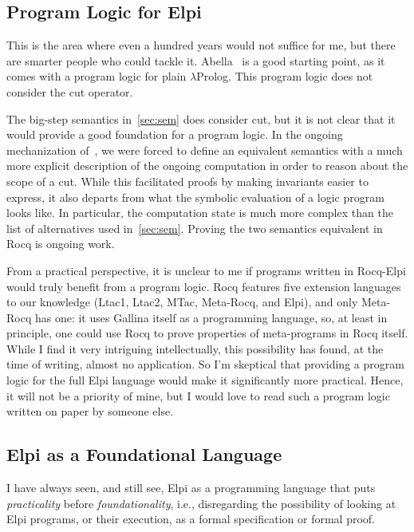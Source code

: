 \documentclass{these-ISSS}
\begin{document}
\subsection{Program Logic for Elpi}

This is the area where even a hundred years would not suffice for me, but
there are smarter people who could tackle it. Abella~\cite{abella} is a good
starting point, as it comes with a program logic for plain $\lambda$Prolog.
This program logic does not consider the cut operator.

The big-step semantics in~\cref{sec:sem} does consider cut,
but it is not clear that it would provide a good
foundation for a program logic. In the ongoing mechanization of~\cite{elpidet},
we were forced to define an equivalent semantics with a much more explicit
description of the ongoing computation in order to reason about the scope of a
cut. While this facilitated proofs by making invariants easier to express, it
also departs from what the symbolic evaluation of a logic program looks like.
In particular, the computation state is much more complex than the list of
alternatives used in~\cref{sec:sem}. Proving the two semantics equivalent in Rocq
is ongoing work.

From a practical perspective, it is unclear to me if programs written in
Rocq-Elpi would truly benefit from a program logic. Rocq features five
extension languages to our knowledge (Ltac1, Ltac2, MTac, Meta-Rocq, and
Elpi), and only Meta-Rocq has one: it uses Gallina itself as a programming
language, so, at least in principle, one could use Rocq to prove properties of
meta-programs in Rocq itself. While I find it very intriguing intellectually,
this possibility has found, at the time of writing, almost no application. So
I'm skeptical that providing a program logic for the full Elpi language would
make it significantly more practical. Hence, it will not be a priority of
mine, but I would love to read such a program logic written on paper by
someone else.

\subsection{Elpi as a Foundational Language}

I have always seen, and still see, Elpi as a programming language that puts
\emph{practicality} before \emph{foundationality}, i.e., disregarding the
possibility of looking at Elpi programs, or their execution, as a formal
specification or formal proof.
\end{document}
